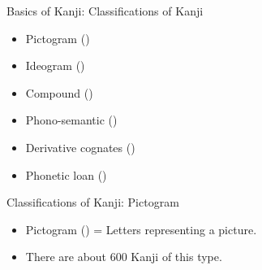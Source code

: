\documentclass[12pt,aspectratio=169]{beamer}
\newenvironment{items}
	{\begin{itemize}
		\setlength\itemsep{5pt}
	}{\end{itemize}}
\begin{document}
	\begin{frame}{Basics of Kanji: Classifications of Kanji}
		\begin{items}
			\setlength\itemsep{3pt}
			\item Pictogram ()
			\item Ideogram ()
			\item Compound ()
			\item Phono-semantic ()
			\item Derivative cognates ()
			\item Phonetic loan ()
		\end{items}
	\end{frame}

	\begin{frame}{Classifications of Kanji: Pictogram}
		\begin{itemize}
			\item Pictogram () = Letters representing a picture.
			\item There are about 600 Kanji of this type.
		\end{itemize}
	\end{frame}
\end{document}
